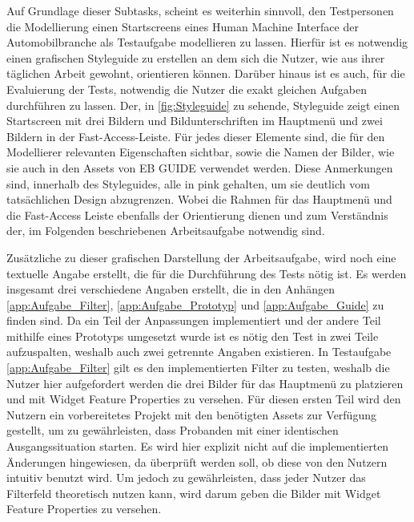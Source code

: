 Auf Grundlage dieser Subtasks, scheint es weiterhin sinnvoll, den Testpersonen die Modellierung einen Startscreens eines Human Machine Interface der Automobilbranche als Testaufgabe modellieren zu lassen.
Hierfür ist es notwendig einen grafischen Styleguide zu erstellen an dem sich die Nutzer, wie aus ihrer täglichen Arbeit gewohnt, orientieren können.
Darüber hinaus ist es auch, für die Evaluierung der Tests, notwendig die Nutzer die exakt gleichen Aufgaben durchführen zu lassen.
Der, in \cref{fig:Styleguide} zu sehende, Styleguide zeigt einen Startscreen mit drei Bildern und Bildunterschriften im Hauptmenü und zwei Bildern in der Fast-Access-Leiste.
Für jedes dieser Elemente sind, die für den Modellierer relevanten Eigenschaften sichtbar, sowie die Namen der Bilder, wie sie auch in den Assets von EB GUIDE verwendet werden.
Diese Anmerkungen sind, innerhalb des Styleguides, alle in pink gehalten, um sie deutlich vom tatsächlichen Design abzugrenzen.
Wobei die Rahmen für das Hauptmenü und die Fast-Access Leiste ebenfalls der Orientierung dienen und zum Verständnis der, im Folgenden beschriebenen Arbeitsaufgabe notwendig sind.

Zusätzliche zu dieser grafischen Darstellung der Arbeitsaufgabe, wird noch eine textuelle Angabe erstellt, die für die Durchführung des Tests nötig ist.
Es werden insgesamt drei verschiedene Angaben erstellt, die in den Anhängen \ref{app:Aufgabe_Filter}, \ref{app:Aufgabe_Prototyp} und \ref{app:Aufgabe_Guide} zu finden sind.
Da ein Teil der Anpassungen implementiert und der andere Teil mithilfe eines Prototyps umgesetzt wurde ist es nötig den Test in zwei Teile aufzuspalten, weshalb auch zwei getrennte Angaben existieren.
In Testaufgabe \ref{app:Aufgabe_Filter} gilt es den implementierten Filter zu testen, weshalb die Nutzer hier aufgefordert werden die drei Bilder für das Hauptmenü zu platzieren und mit Widget Feature Properties zu versehen.
Für diesen ersten Teil wird den Nutzern ein vorbereitetes Projekt mit den benötigten Assets zur Verfügung gestellt, um zu gewährleisten, dass Probanden mit einer identischen Ausgangssituation starten.
Es wird hier explizit nicht auf die implementierten Änderungen hingewiesen, da überprüft werden soll, ob diese von den Nutzern intuitiv benutzt wird.
Um jedoch zu gewährleisten, dass jeder Nutzer das Filterfeld theoretisch nutzen kann, wird darum geben die Bilder mit Widget Feature Properties zu versehen.

